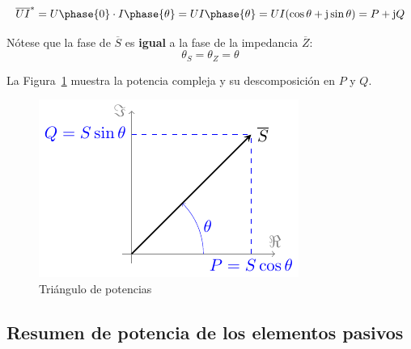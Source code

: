 \begin{itemize}
		\begin{equation*}
			\overline{U} \overline{I}^* = U\phase{0} \cdot I\phase{\theta} = UI\phase{\theta}= U I (\cos\theta + \mathrm{j} \sin\theta) = P + \mathrm{j} Q
		\end{equation*}
		\begin{remark}
			Nótese que la fase de $\overline{S}$ es \textbf{igual} a la fase de la impedancia $\overline{Z}$:
			\begin{equation*}
				\theta_S = \theta_Z = \theta
			\end{equation*}
		\end{remark}
		La Figura~\ref{fig.trianguloPotencias} muestra la potencia compleja y su descomposición en $P$ y $Q$.
		\begin{figure}[H]
			\centering
			\includegraphics{../figs/trianguloPotencias.pdf}
			\caption{Triángulo de potencias}
			\label{fig.trianguloPotencias}
		\end{figure}
	\end{itemize}
	
	
	\subsection{Resumen de potencia de los elementos pasivos}
	
